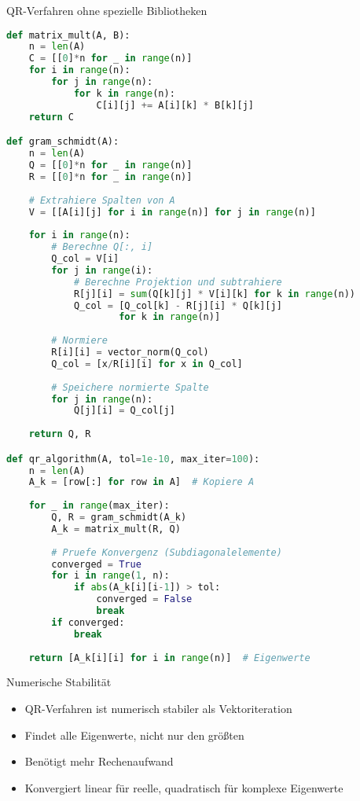 \begin{examplecode}{QR-Verfahren ohne spezielle Bibliotheken}
\begin{lstlisting}[language=Python, style=basesmol]
def matrix_mult(A, B):
    n = len(A)
    C = [[0]*n for _ in range(n)]
    for i in range(n):
        for j in range(n):
            for k in range(n):
                C[i][j] += A[i][k] * B[k][j]
    return C

def gram_schmidt(A):
    n = len(A)
    Q = [[0]*n for _ in range(n)]
    R = [[0]*n for _ in range(n)]
    
    # Extrahiere Spalten von A
    V = [[A[i][j] for i in range(n)] for j in range(n)]
    
    for i in range(n):
        # Berechne Q[:, i]
        Q_col = V[i]
        for j in range(i):
            # Berechne Projektion und subtrahiere
            R[j][i] = sum(Q[k][j] * V[i][k] for k in range(n))
            Q_col = [Q_col[k] - R[j][i] * Q[k][j] 
                    for k in range(n)]
        
        # Normiere
        R[i][i] = vector_norm(Q_col)
        Q_col = [x/R[i][i] for x in Q_col]
        
        # Speichere normierte Spalte
        for j in range(n):
            Q[j][i] = Q_col[j]
            
    return Q, R

def qr_algorithm(A, tol=1e-10, max_iter=100):
    n = len(A)
    A_k = [row[:] for row in A]  # Kopiere A
    
    for _ in range(max_iter):
        Q, R = gram_schmidt(A_k)
        A_k = matrix_mult(R, Q)
        
        # Pruefe Konvergenz (Subdiagonalelemente)
        converged = True
        for i in range(1, n):
            if abs(A_k[i][i-1]) > tol:
                converged = False
                break
        if converged:
            break
            
    return [A_k[i][i] for i in range(n)]  # Eigenwerte
\end{lstlisting}
\end{examplecode}

\begin{remark2}{Numerische Stabilität}
\begin{itemize}
    \item QR-Verfahren ist numerisch stabiler als Vektoriteration
    \item Findet alle Eigenwerte, nicht nur den größten
    \item Benötigt mehr Rechenaufwand
    \item Konvergiert linear für reelle, quadratisch für komplexe Eigenwerte
\end{itemize}
\end{remark2}

